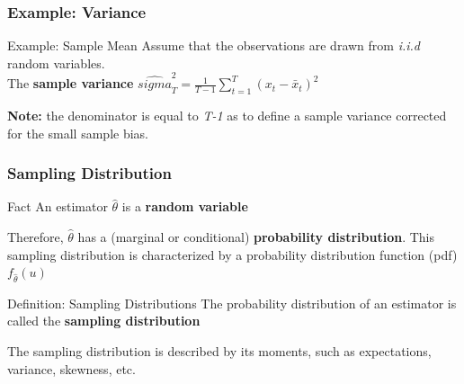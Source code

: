 \documentclass{beamer}
\begin{document}
\begin{frame}
  \frametitle{Example: Variance}

  \begin{exampleblock}{Example: Sample Mean}
    Assume that the observations are drawn from \emph{i.i.d} random variables.\\
    The \textbf{sample variance} $\hat{sigma}^2_T = \frac{1}{T-1} \sum_{t=1}^T (x_t - \bar{x}_t)^2$
  \end{exampleblock}

\textbf{Note:} the denominator is equal to \emph{T-1} as to define a sample variance corrected for the small sample bias. 
  
\end{frame}



\begin{frame}
  \frametitle{Sampling Distribution}

  \begin{block}{Fact}
    An estimator $\hat{\theta}$ is a \textbf{random variable}
  \end{block}
  Therefore, $\hat{\theta}$ has a (marginal or conditional) \textbf{probability distribution}. This sampling distribution is characterized by a probability distribution function (pdf) $f_{\hat{\theta}}(u)$

  \begin{block}{Definition: Sampling Distributions}
    The probability distribution of an estimator is called the \textbf{sampling distribution}
  \end{block}
  The sampling distribution is described by its moments, such as expectations, variance, skewness, etc.
  \end{frame}
\end{document}

